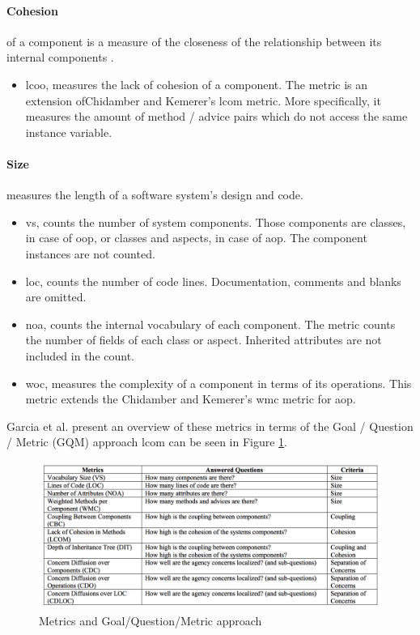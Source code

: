 \paragraph{Cohesion}of a component is a measure of the closeness of the relationship between its internal components \cite{sommerville2004software}.
	\begin{itemize}
		\item \ac{lcoo}, measures the lack of cohesion of a component.
		The metric is an extension ofChidamber and Kemerer's \cite{chidamber1994metrics} \ac{lcom} metric.
		More specifically, it measures the amount of method / advice pairs which do not access the same instance variable.
	\end{itemize}

\paragraph{Size}measures the length of a software system's design and code.
	\begin{itemize}
		\item \ac{vs}, counts the number of system components.
		Those components are classes, in case of \ac{oop}, or classes and aspects, in case of \ac{aop}.
		The component instances are not counted.

		\item \ac{loc}, counts the number of code lines.
		Documentation, comments and blanks are omitted.

		\item \ac{noa}, counts the internal vocabulary of each component.
		The metric counts the number of fields of each class or aspect.
		Inherited attributes are not included in the count.

		\item \ac{woc}, measures the complexity of a component in terms of its operations.
		This metric extends the Chidamber and Kemerer's \cite{chidamber1994metrics} \ac{wmc} metric for \ac{aop}.
	\end{itemize}

Garcia et al. \cite{garcia2003agents} present an overview of these metrics in terms of the Goal / Question / Metric (GQM) approach \cite{wohlin2012experimentation} \ac{lcom} can be seen in Figure \ref{fig:metrics_questions}.

\begin{figure}[H]
	\centering
  	\includegraphics[width=.9\textwidth]{figures/metrics_questions.png}
  	\caption{Metrics and Goal/Question/Metric approach \cite{garcia2003agents}}
  	\label{fig:metrics_questions}
\end{figure}
